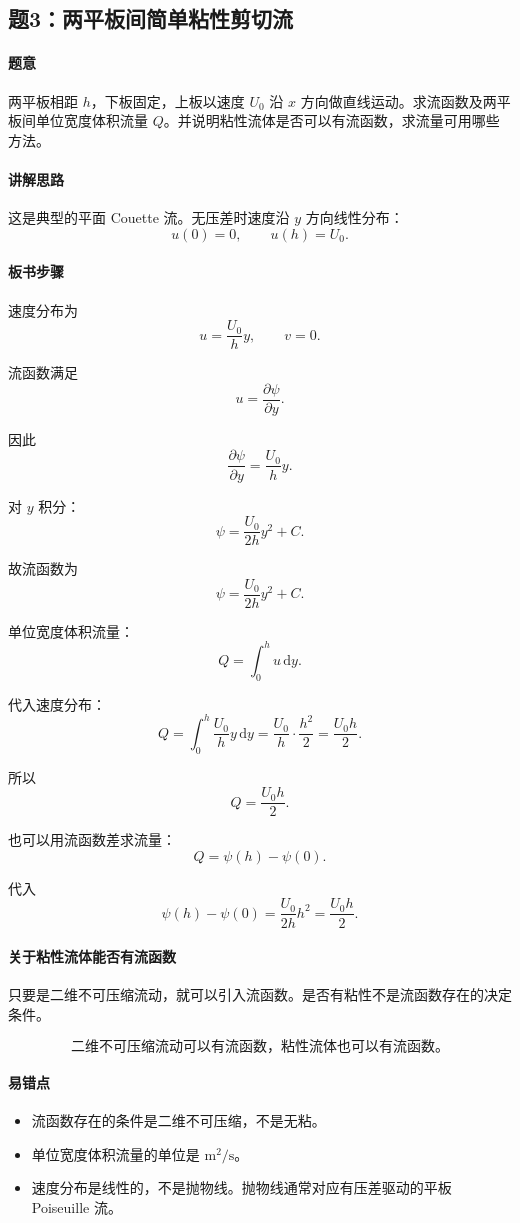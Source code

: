 \documentclass[12pt,a4paper]{ctexart}
\newcommand{\dd}{\mathrm d}
\begin{document}
\subsection*{题3：两平板间简单粘性剪切流}

\paragraph{题意}
两平板相距 $h$，下板固定，上板以速度 $U_0$ 沿 $x$ 方向做直线运动。求流函数及两平板间单位宽度体积流量 $Q$。并说明粘性流体是否可以有流函数，求流量可用哪些方法。

\paragraph{讲解思路}
这是典型的平面 Couette 流。无压差时速度沿 $y$ 方向线性分布：
\[
u(0)=0,\qquad u(h)=U_0.
\]

\paragraph{板书步骤}
速度分布为
\[
\boxed{
u=\frac{U_0}{h}y,\qquad v=0.
}
\]

流函数满足
\[
u=\frac{\partial\psi}{\partial y}.
\]

因此
\[
\frac{\partial\psi}{\partial y}
=\frac{U_0}{h}y.
\]

对 $y$ 积分：
\[
\psi=\frac{U_0}{2h}y^2+C.
\]

故流函数为
\[
\boxed{
\psi=\frac{U_0}{2h}y^2+C.
}
\]

单位宽度体积流量：
\[
Q=\int_0^h u\,\dd y.
\]

代入速度分布：
\[
Q=\int_0^h \frac{U_0}{h}y\,\dd y
=\frac{U_0}{h}\cdot\frac{h^2}{2}
=\frac{U_0h}{2}.
\]

所以
\[
\boxed{
Q=\frac{U_0h}{2}.
}
\]

也可以用流函数差求流量：
\[
Q=\psi(h)-\psi(0).
\]

代入
\[
\psi(h)-\psi(0)
=\frac{U_0}{2h}h^2
=\frac{U_0h}{2}.
\]

\paragraph{关于粘性流体能否有流函数}
只要是二维不可压缩流动，就可以引入流函数。是否有粘性不是流函数存在的决定条件。

\[
\boxed{
\text{二维不可压缩流动可以有流函数，粘性流体也可以有流函数。}
}
\]

\paragraph{易错点}
\begin{itemize}
  \item 流函数存在的条件是二维不可压缩，不是无粘。
  \item 单位宽度体积流量的单位是 $\mathrm{m^2/s}$。
  \item 速度分布是线性的，不是抛物线。抛物线通常对应有压差驱动的平板 Poiseuille 流。
\end{itemize}
\end{document}
